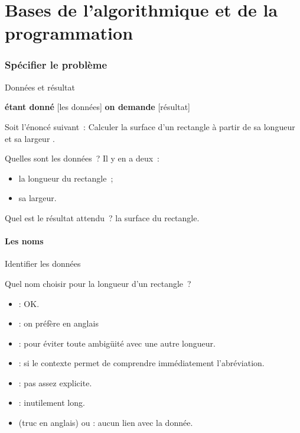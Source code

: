 \part{Bases de l'algorithmique et de la programmation}
\frame{\partpage}

\section{Spécifier le problème}
\frame{\sectionpage}
\begin{frame}{Données et résultat}
  \begin{block}{}
  \begin{center}
    {\textbf{étant donné} [les données] 
    \textbf{on demande} [résultat]}
  \end{center}
  \end{block}
  \pause
  \begin{example}
    Soit l’énoncé suivant~:
    \og
      Calculer la surface d’un rectangle 
      à partir de sa longueur et sa largeur
    \fg.

    Quelles sont les données~? \pause Il y en a deux~:
    \begin{itemize}
            \item la longueur du rectangle~;
            \item sa largeur.
    \end{itemize}

    \pause
    Quel est le résultat attendu~? \pause la surface du rectangle.
  \end{example}
\end{frame}

\subsection{Les noms}
\begin{frame}{Identifier les données}

  \begin{example}
  Quel nom choisir pour la longueur d’un rectangle~?

  \pause
  \begin{itemize}
    \item
       \pause: OK.
    \pause
    \item
       \pause: on préfère en anglais
    \pause
    \item
       \pause: pour éviter toute ambigüité avec une
      autre longueur.
    \pause
    \item
       \pause: si le contexte permet de comprendre immédiatement
      l’abréviation.
    \pause
    \item
       \pause: pas assez explicite.
    \pause
    \item
       \pause: inutilement long.
    \pause
    \item
       (truc en anglais) ou \pause: aucun lien avec la donnée.
  \end{itemize}
  \end{example}
\end{frame}

